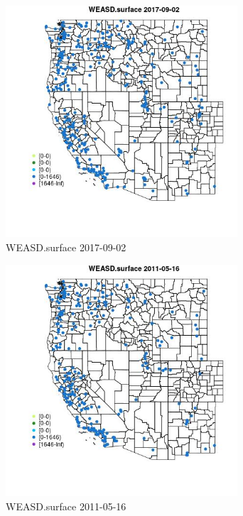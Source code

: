 \begin{figure} 
\centering  
\includegraphics[width=0.77\textwidth]{Code_Outputs/Report_ML_input_PM25_Step4_part_e_de_duplicated_aves_compiled_2019-05-21wNAs_MapObsWEASDsurface2017-09-02.jpg} 
\caption{\label{fig:Report_ML_input_PM25_Step4_part_e_de_duplicated_aves_compiled_2019-05-21wNAsMapObsWEASDsurface2017-09-02}WEASD.surface 2017-09-02} 
\end{figure} 
 

\begin{figure} 
\centering  
\includegraphics[width=0.77\textwidth]{Code_Outputs/Report_ML_input_PM25_Step4_part_e_de_duplicated_aves_compiled_2019-05-21wNAs_MapObsWEASDsurface2011-05-16.jpg} 
\caption{\label{fig:Report_ML_input_PM25_Step4_part_e_de_duplicated_aves_compiled_2019-05-21wNAsMapObsWEASDsurface2011-05-16}WEASD.surface 2011-05-16} 
\end{figure} 
 

